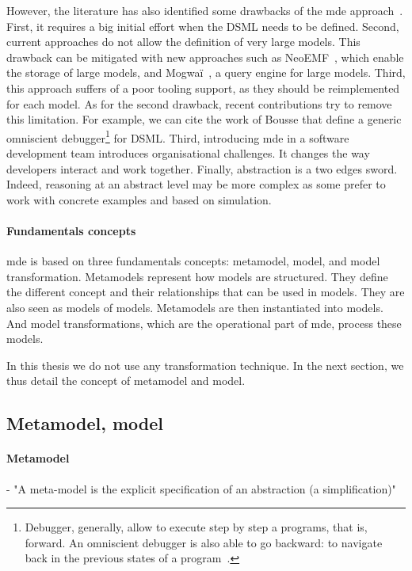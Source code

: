However, the literature has also identified some drawbacks of the \gls{mde} approach~\cite{DBLP:conf/ifm/Kent02, DBLP:conf/uml/BakerLW05, DBLP:conf/models/WhittleHRBH13, DBLP:conf/icse/HutchinsonRW11}.
First, it requires a big initial effort when the DSML needs to be defined.
Second, current approaches do not allow the definition of very large models.
This drawback can be mitigated with new approaches such as NeoEMF~\cite{DBLP:conf/ecmdafa/BenelallamGSTL14, DBLP:journals/scp/DanielSBTVGC17}, which enable the storage of large models,  and Mogwaï~\cite{DBLP:conf/rcis/DanielSC16}, a query engine for large models.
Third, this approach suffers of a poor tooling support, as they should be reimplemented for each model.
As for the second drawback, recent contributions try to remove this limitation.
For example, we can cite the work of Bousse \etal \cite{DBLP:journals/jss/BousseLCWB18} that define a generic omniscient debugger\footnote{Debugger, generally, allow to execute step by step a programs, that is, forward. An omniscient debugger is also able to go backward: to navigate back in the previous states of a program~\cite{DBLP:journals/corr/cs-SE-0310016}.} for DSML.
Third, introducing \gls{mde} in a software development team introduces organisational challenges.
It changes the way developers interact and work together.
Finally, abstraction is a two edges sword.
Indeed, reasoning at an abstract level may be more complex as some prefer to work with concrete examples and based on simulation.

\paragraph{Fundamentals concepts}
\gls{mde} is based on three fundamentals concepts: metamodel, model, and model transformation.
Metamodels represent how models are structured.
They define the different concept and their relationships that can be used in models.
They are also seen as models of models.
Metamodels are then instantiated into models.
And model transformations, which are the operational part of \gls{mde}, process these models.

In this thesis we do not use any transformation technique.
In the next section, we thus detail the concept of metamodel and model.

\subsection{Metamodel, model}

\paragraph{Metamodel}
 - "A  meta-model  is  the  explicit  specification  of  an  abstraction (a simplification)" \cite{DBLP:conf/kbse/BezivinG01}
  
